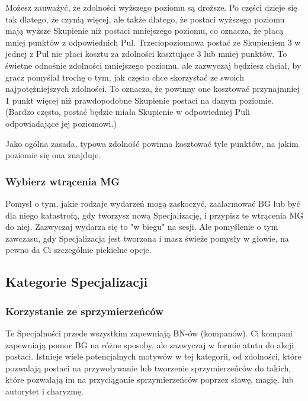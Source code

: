 Możesz zauważyć, że zdolności wyższego poziomu są droższe. Po części dzieje się tak dlatego, że czynią więcej, ale także dlatego, że postaci wyższego poziomu mają wyższe Skupienie niż postaci mniejszego poziomu, co oznacza, że płacą mniej punktów z odpowiednich Pul. Trzeciopoziomowa postać ze Skupieniem 3 w jednej z Pul nie płaci kosztu za zdolności kosztujące 3 lub mniej punktów. To świetne odnośnie zdolności mniejszego poziomu, ale zazwyczaj będziesz chciał, by gracz pomyślał trochę o tym, jak często chce skorzystać ze swoich najpotężniejszych zdolności. To oznacza, że powinny one kosztować przynajmniej 1 punkt więcej niż prawdopodobne Skupienie postaci na danym poziomie. (Bardzo często, postać będzie miała Skupienie w odpowiedniej Puli odpowiadające jej poziomowi.)

Jako ogólna zasada, typowa zdolność powinna kosztować tyle punktów, na jakim poziomie się ona znajduje. 

\subsubsection{Wybierz wtrącenia MG}

Pomysł o tym, jakie rodzaje wydarzeń mogą zaskoczyć, zaalarmować BG lub być dla niego katastrofą, gdy tworzysz nową Specjalizację, i przypisz te wtrącenia MG do niej. Zazwyczaj wydarza się to "w biegu" na sesji. Ale pomyślenie o tym zawczasu, gdy Specjalizacja jest tworzona i masz świeże pomysły w głowie, na pewno da Ci szczególnie piekielne opcje.

\subsection{Kategorie Specjalizacji}

\subsubsection{Korzystanie ze sprzymierzeńców}

Te Specjalności przede wszystkim zapewniają BN-ów (kompanów). Ci kompani zapewniają pomoc BG na różne sposoby, ale zazwyczaj w formie atutu do akcji postaci.
Istnieje wiele potencjalnych motywów w tej kategorii, od zdolności, które pozwalają postaci na przywoływanie lub tworzenie sprzymierzeńców do takich, które pozwalają im na przyciąganie sprzymierzeńców poprzez sławę, magię, lub autorytet i charyzmę. 

